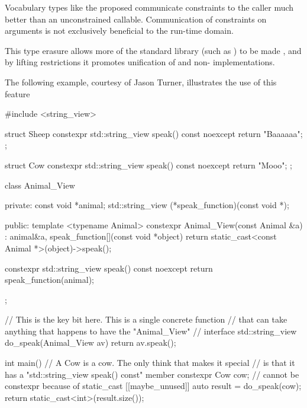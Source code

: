 \documentclass{wg21}
\begin{document}
    Vocabulary types like the proposed  communicate constraints to the caller much better than an unconstrained callable. Communication of constraints on arguments is not exclusively beneficial to the run-time domain.

    This type erasure allows more of the standard library (such as ) to be made , and by lifting restrictions it promotes unification of  and non- implementations.

    \pagebreak

    The following example, courtesy of Jason Turner, illustrates the use of this feature

    \begin{colorblock}
        #include <string_view>

        struct Sheep {
            constexpr std::string_view speak() const noexcept { return "Baaaaaa"; }
        };

        struct Cow {
            constexpr std::string_view speak() const noexcept { return "Mooo"; }
        };

        class Animal_View {
            private:
            const void *animal;
            std::string_view (*speak_function)(const void *);

            public:
            template <typename Animal>
            constexpr Animal_View(const Animal &a)
            : animal{&a}, speak_function{[](const void *object) {
                    return static_cast<const Animal *>(object)->speak();
            }} {}

            constexpr std::string_view speak() const noexcept {
                return speak_function(animal);
            }
        };

        // This is the key bit here. This is a single concrete function
        // that can take anything that happens to have the "Animal_View"
        // interface
        std::string_view do_speak(Animal_View av) { return av.speak(); }

        int main() {
            // A Cow is a cow. The only think that makes it special
            // is that it has a "std::string_view speak() const" member
            constexpr Cow cow;
            // cannot be constexpr because of static_cast
            [[maybe_unused]] auto result = do_speak(cow);
            return static_cast<int>(result.size());
        }
    \end{colorblock}
\end{document}
